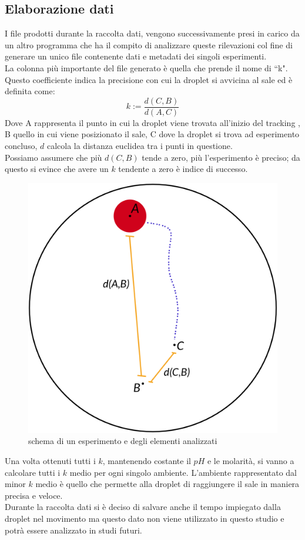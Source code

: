 \subsection{Elaborazione dati}
I file prodotti durante la raccolta dati, vengono successivamente presi in carico da un altro programma che ha il compito di analizzare queste rilevazioni col fine di generare un unico file contenente dati e metadati dei singoli esperimenti.
\\La colonna più importante del file generato è quella che prende il nome di ``k". Questo coefficiente indica la precisione con cui la droplet si avvicina al sale ed è definita come:
\begin{equation} 	
	k := \frac { d(C,B) }{ d(A,C) }
\end{equation}
Dove A rappresenta il punto in cui la droplet viene trovata all'inizio del tracking , B quello in cui viene posizionato il sale, C dove la droplet si trova ad esperimento concluso, $d$ calcola la distanza euclidea tra i punti in questione. 
\\Possiamo assumere che più $d(C,B)$ tende a zero, più l'esperimento è preciso; da questo si evince che avere un $k$ tendente a zero è indice di successo.   
\begin{figure}[h]
	  \includegraphics[scale=0.30]{immagini/schema.png}
		\centering
	 \caption{schema di un esperimento e degli elementi analizzati}
\end{figure} 
Una volta ottenuti tutti i $k$, mantenendo costante il $pH$ e le molarità, si vanno a calcolare tutti i $k$ medio per ogni singolo ambiente. L'ambiente rappresentato dal minor $k$ medio è quello che permette alla droplet di raggiungere il sale in maniera precisa e veloce. 
\\Durante la raccolta dati si è deciso di salvare anche il tempo impiegato dalla droplet nel movimento ma questo dato non viene utilizzato in questo studio e potrà essere analizzato in studi futuri. 

